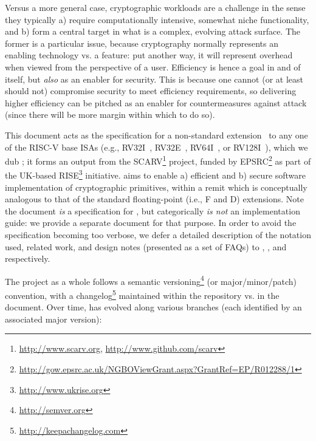 
Versus a more general case, cryptographic workloads are a challenge in the
sense they typically
a) require computationally intensive, somewhat niche functionality,
   and
b) form a central target in what is a complex, evolving attack surface.
The former is a particular issue, because cryptography normally represents
an enabling technology vs. a feature: put another way, it will represent
overhead when viewed from the perspective of a user.  Efficiency is hence 
a goal in and of itself, but {\em also} as an enabler for security.  This 
is because one cannot (or at least should not) compromise security to meet 
efficiency requirements, so delivering higher efficiency can be pitched as 
an enabler for countermeasures against attack (since there will be more 
margin within which to do so).

This document acts as the specification for a 
non-standard extension~\cite[Section 21.1]{SCARV:RV:ISA:I:17} 
to any one of the RISC-V base ISAs
(e.g., RV32I~\cite[Section 2]{SCARV:RV:ISA:I:17}, RV32E~\cite[Section 3]{SCARV:RV:ISA:I:17}, RV64I~\cite[Section 4]{SCARV:RV:ISA:I:17}, or RV128I~\cite[Section 5]{SCARV:RV:ISA:I:17}),
which we dub \XCRYPTO; it forms an output from the SCARV\footnote{
\url{http://www.scarv.org}, \url{http://www.github.com/scarv}
} project, funded by EPSRC\footnote{
\url{http://gow.epsrc.ac.uk/NGBOViewGrant.aspx?GrantRef=EP/R012288/1}
} as part of the UK-based RISE\footnote{
\url{http://www.ukrise.org}
} initiative.  
\XCRYPTO aims to enable
a) efficient
   and
b) secure
software implementation of cryptographic primitives, within a remit which
is conceptually analogous to that of the standard floating-point (i.e., F
and D) extensions.
Note the document {\em is} a specification for \XCRYPTO, but categorically
{\em is not} an implementation guide: we provide a separate document for 
that purpose.  In order to avoid the specification becoming too verbose,
we defer a detailed description of the notation used, related work, and 
design notes (presented as a set of FAQs) to
,
,
and
respectively.  


The project as a whole follows a semantic 
versioning\footnote{
\url{http://semver.org}
} (or major/minor/patch) convention, with a changelog\footnote{
\url{http://keepachangelog.com}
} maintained within the repository vs. in the document.
Over time, \XCRYPTO has evolved along various branches 
(each identified by an associated major version):

